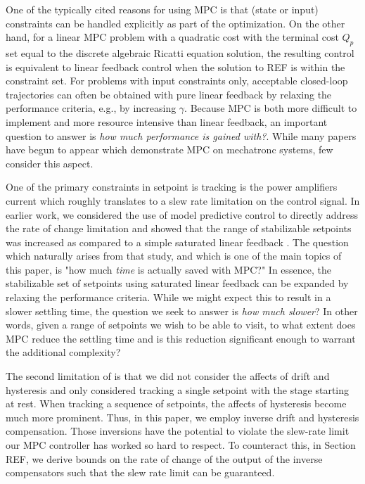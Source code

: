 \documentclass[journal,twocolumn,twoside]{IEEEtran}
\begin{document}
One of the typically cited reasons for using MPC is that (state or input) constraints can be handled explicitly as part of the optimization. On the other hand, for a linear MPC problem with a quadratic cost with the terminal cost $Q_p$ set equal to the discrete algebraic Ricatti equation solution, the resulting control is equivalent to linear feedback control when the solution to REF is within the constraint set. For problems with input constraints only, acceptable closed-loop trajectories can often be obtained with pure linear feedback by relaxing the performance criteria, e.g., by increasing $\gamma$. Because MPC is both more difficult to implement and more resource intensive than linear feedback, an important question to answer is \emph{how much performance is gained with?}. While many papers have begun to appear which demonstrate MPC on mechatronc systems, few consider this aspect.



One of the primary constraints in setpoint is tracking is the power amplifiers current which roughly translates to a slew rate limitation on the control signal. In earlier work, we considered the use of model predictive control to directly address the rate of change limitation and showed that the range of stabilizable setpoints was increased as compared to a simple saturated linear feedback \cite{braker_application_2017}. The question which naturally arises from that study, and which is one of the main topics of this paper, is "how much \emph{time} is actually saved with MPC?" In essence, the stabilizable set of setpoints using saturated linear feedback can be expanded by relaxing the performance criteria. While we might expect this to result in a slower settling time, the question we seek to answer is \emph{how much slower}? In other words, given a range of setpoints we wish to be able to visit, to what extent does MPC reduce the settling time and is this reduction significant enough to warrant the additional complexity?

The second limitation of \cite{braker_application_2017} is that we did not consider the affects of drift and hysteresis and only considered tracking a single setpoint with the stage starting at rest. When tracking a sequence of setpoints, the affects of hysteresis become much more prominent. Thus, in this paper, we employ inverse drift and hysteresis compensation. Those inversions have the potential to violate the slew-rate limit our MPC controller has worked so hard to respect. To counteract this, in Section REF, we derive bounds on the rate of change of the output of the inverse compensators such that the slew rate limit can be guaranteed.
\end{document}
